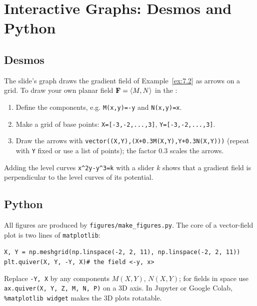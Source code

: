 \section{Interactive Graphs: Desmos and Python}\label{app:interactive}

\subsection{Desmos}

The slide's graph 
draws the gradient field of Example~\ref{ex:7.2} as arrows on a grid. To draw
your own planar field $\mathbf{F}=\left\langle M,N \right\rangle$ in the
:
\begin{enumerate}
\item Define the components, e.g. \texttt{M(x,y)=-y} and \texttt{N(x,y)=x}.
\item Make a grid of base points: \texttt{X=[-3,-2,...,3]}, \texttt{Y=[-3,-2,...,3]}.
\item Draw the arrows with \texttt{vector((X,Y),(X+0.3M(X,Y),Y+0.3N(X,Y)))}
      (repeat with \texttt{Y} fixed or use a list of points); the factor $0.3$
      scales the arrows.
\end{enumerate}
Adding the level curves \texttt{x\^{}2y-y\^{}3=k} with a slider $k$ shows that a
gradient field is perpendicular to the level curves of its potential.

\subsection{Python}

All figures are produced by \texttt{figures/make\_figures.py}. The core of a
vector-field plot is two lines of \texttt{matplotlib}:
\begin{center}
\begin{minipage}{0.85\linewidth}
\small
\texttt{X, Y = np.meshgrid(np.linspace(-2, 2, 11), np.linspace(-2, 2, 11))}\\
\texttt{plt.quiver(X, Y, -Y, X)\quad\# the field <-y, x>}
\end{minipage}
\end{center}
Replace \texttt{-Y, X} by any components $M(X,Y)$, $N(X,Y)$; for fields in space use
\texttt{ax.quiver(X, Y, Z, M, N, P)} on a 3D axis. In Jupyter or Google Colab,
\texttt{\%matplotlib widget} makes the 3D plots rotatable.
